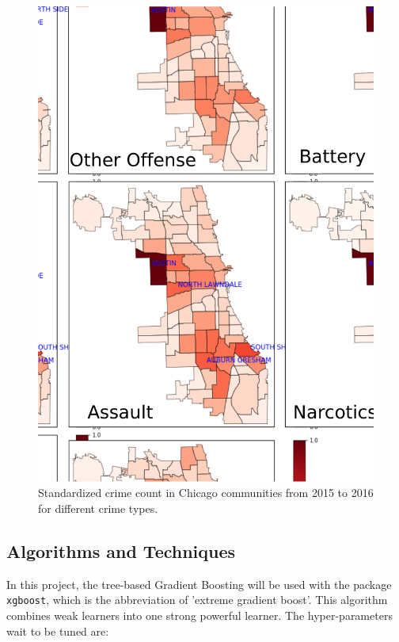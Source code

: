\documentclass[12pt]{article}
\begin{document}
\begin{figure}[ht]
\includegraphics[scale=0.35]{figure/community.eps}
\centering
\caption{Standardized crime count in Chicago communities from 2015 to 2016 for different crime types.}
\label{fig:community}
\end{figure}

\subsection{Algorithms and Techniques}
In this project, the tree-based Gradient Boosting will be used with the package \verb|xgboost|, which is the abbreviation of 'extreme gradient boost'. This algorithm combines weak learners into one strong powerful learner. The hyper-parameters wait to be tuned are:
\end{document}

